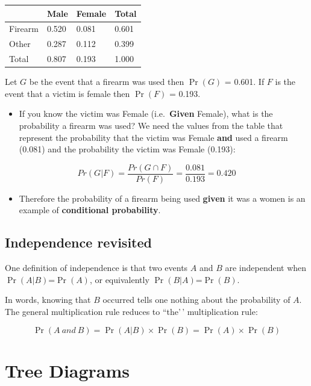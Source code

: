\documentclass[
  oneside]{krantz}
\providecommand{\tightlist}{%
  \setlength{\itemsep}{0pt}\setlength{\parskip}{0pt}}
\begin{document}
\begin{longtable}[]{@{}llll@{}}
\toprule
& Male & Female & Total\tabularnewline
\midrule
\endhead
Firearm & 0.520 & 0.081 & 0.601\tabularnewline
Other & 0.287 & 0.112 & 0.399\tabularnewline
Total & 0.807 & 0.193 & 1.000\tabularnewline
\bottomrule
\end{longtable}

Let \(G\) be the event that a firearm was used then \(\Pr(G)\) = 0.601. If \(F\) is the event that a victim is female then \(\Pr(F)\) = 0.193.

\begin{itemize}
\tightlist
\item
  If you know the victim was Female (i.e.~\textbf{Given} Female), what is the probability a firearm was used? We need the values from the table that represent the probability that the victim was Female \textbf{and} used a firearm (0.081) and the probability the victim was Female (0.193):
\end{itemize}

\[Pr(G|F) = \frac{Pr(G \cap F)} {Pr(F)} = \frac{0.081}{0.193} = 0.420\]

\begin{itemize}
\tightlist
\item
  Therefore the probability of a firearm being used \textbf{given} it was a women
  is an example of \textbf{conditional probability}.
\end{itemize}

\hypertarget{independence-revisited}{%
\subsection{Independence revisited}\label{independence-revisited}}

One definition of independence is that two events \(A\) and \(B\) are independent when \(\Pr(A|B)\)=\(\Pr(A)\), or equivalently \(\Pr(B|A)\)=\(\Pr(B)\).

In words, knowing that \(B\) occurred tells one nothing about the probability of \(A\). The general multiplication rule reduces to ``the'\,' multiplication rule:

\[
    \Pr(A ~and~ B)  =  \Pr(A|B) \times \Pr(B) = \Pr(A) \times \Pr(B) 
\]

\hypertarget{tree-diagrams}{%
\section{Tree Diagrams}\label{tree-diagrams}}
\end{document}
